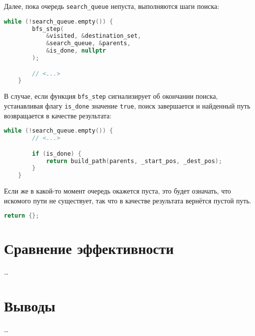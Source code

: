 \documentclass[a4paper, 12pt]{article}
\begin{document}
Далее, пока очередь \verb|search_queue| непуста, выполняются шаги поиска:
\begin{lstlisting}[language=C++]
    while (!search_queue.empty()) {
        bfs_step(
            &visited, &destination_set,
            &search_queue, &parents,
            &is_done, nullptr
        );

        // <...>
    }
\end{lstlisting}

В случае, если функция \verb|bfs_step| сигнализирует об окончании поиска, устанавливая флагу \verb|is_done| значение \verb|true|, поиск завершается и найденный путь возвращается в качестве результата:
\begin{lstlisting}[language=C++]
    while (!search_queue.empty()) {
        // <...>

        if (is_done) {
            return build_path(parents, _start_pos, _dest_pos);
        }
    }
\end{lstlisting}

Если же в какой-то момент очередь окажется пуста, это  будет означать, что искомого пути не существует, так что в качестве результата вернётся пустой путь.
\begin{lstlisting}[language=C++]
    return {};
\end{lstlisting}

\section{Сравнение эффективности}
\ldots

\section{Выводы}
\ldots
\end{document}

